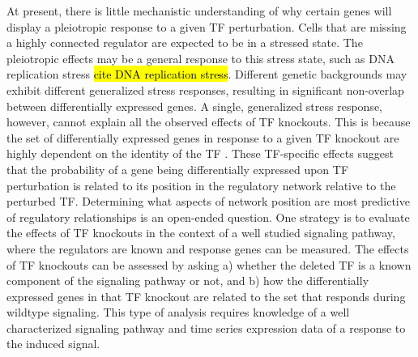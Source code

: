 At present, there is little mechanistic understanding of why certain genes will display a pleiotropic response to a given TF perturbation. Cells that are missing a highly connected regulator are expected to be in a stressed state. The pleiotropic effects may be a general response to this stress state, such as DNA replication stress \hl{cite DNA replication stress}. Different genetic backgrounds may exhibit different generalized stress responses, resulting in significant non-overlap between differentially expressed genes. A single, generalized stress response, however, cannot explain all the observed effects of TF knockouts. This is because the set of differentially expressed genes in response to a given TF knockout are highly dependent on the identity of the TF \cite{Liu2024}. These TF-specific effects suggest that the probability of a gene being differentially expressed upon TF perturbation is related to its position in the regulatory network relative to the perturbed TF. Determining what aspects of network position are most predictive of regulatory relationships is an open-ended question. One strategy is to evaluate the effects of TF knockouts in the context of a well studied signaling pathway, where the regulators are known and response genes can be measured. The effects of TF knockouts can be assessed by asking a) whether the deleted TF is a known component of the signaling pathway or not, and b) how the differentially expressed genes in that TF knockout are related to the set that responds during wildtype signaling. This type of analysis requires knowledge of a well characterized signaling pathway and time series expression data of a response to the induced signal.




